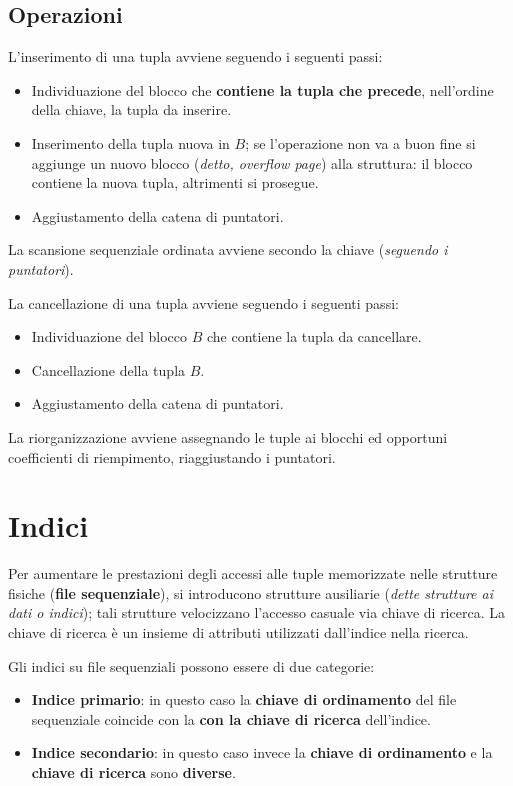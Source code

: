 \documentclass[oneside,a4paper,11pt]{book}
\theoremstyle{italicstyle}
\theoremstyle{normStyle}
\begin{document}
\subsection{Operazioni}
L'inserimento di una tupla avviene seguendo i seguenti passi:
\begin{itemize}
    \item Individuazione del blocco che \textbf{contiene la tupla che precede},
    nell'ordine della chiave, la tupla da inserire.
    \item Inserimento della tupla nuova in $B$; se l'operazione non va a buon fine 
    si aggiunge un nuovo blocco (\textit{detto, overflow page}) alla struttura: 
    il blocco contiene la nuova tupla, altrimenti si prosegue.
    \item Aggiustamento della catena di puntatori.
\end{itemize}

La scansione sequenziale ordinata avviene secondo la chiave (\textit{seguendo 
i puntatori}).

La cancellazione di una tupla avviene seguendo i seguenti passi:
\begin{itemize}
    \item Individuazione del blocco $B$ che contiene la tupla da cancellare.
    \item Cancellazione della tupla $B$.
    \item Aggiustamento della catena di puntatori.
\end{itemize}

La riorganizzazione avviene assegnando le tuple ai blocchi ed opportuni coefficienti 
di riempimento, riaggiustando i puntatori.
\section{Indici}
Per aumentare le prestazioni degli accessi alle tuple memorizzate nelle strutture fisiche 
(\textbf{file sequenziale}), si introducono strutture ausiliarie (\textit{dette 
strutture ai dati o indici}); tali strutture velocizzano l'accesso casuale via chiave di ricerca.
La chiave di ricerca è un insieme di attributi utilizzati dall'indice nella ricerca.

Gli indici su file sequenziali possono essere di due categorie:
\begin{itemize}
    \item \textbf{Indice primario}: in questo caso la \textbf{chiave di ordinamento} del file 
    sequenziale coincide con la \textbf{con la chiave di ricerca} dell'indice.
    \item \textbf{Indice secondario}: in questo caso invece la \textbf{chiave di 
    ordinamento} e la \textbf{chiave di ricerca} sono \textbf{diverse}.
\end{itemize}
\end{document}
